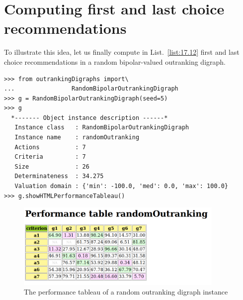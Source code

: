 \section{Computing first and last choice recommendations}
\label{sec:17.4}

To illustrate this idea, let us finally compute in List.~\vref{list:17.12} first and last choice recommendations in a random bipolar-valued outranking digraph.
\begin{lstlisting}[caption={Generating a random bipolar-valued outranking digraph},label=list:17.12]
>>> from outrankingDigraphs import\
...                RandomBipolarOutrankingDigraph
>>> g = RandomBipolarOutrankingDigraph(seed=5)
>>> g
  *------- Object instance description ------*
   Instance class   : RandomBipolarOutrankingDigraph
   Instance name    : randomOutranking
   Actions          : 7
   Criteria         : 7
   Size             : 26
   Determinateness  : 34.275
   Valuation domain : {'min': -100.0, 'med': 0.0, 'max': 100.0}
>>> g.showHTMLPerformanceTableau()
\end{lstlisting}
\begin{figure}[h]
\includegraphics[width=10cm]{Figures/17-6-randomOutranking.png}
\caption{The performance tableau of a random outranking digraph instance}
\label{fig:17.6}       %
\end{figure}

